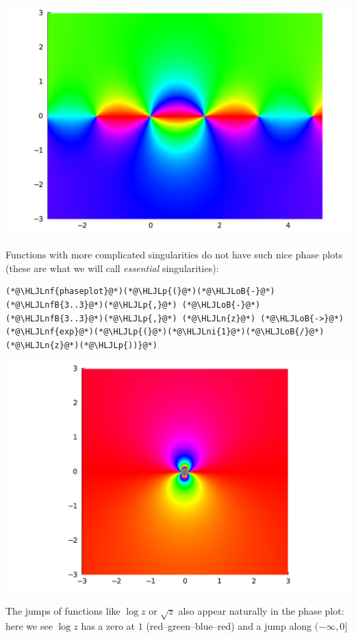 \documentclass[12pt,a4paper]{article}
\newcommand{\HLJLn}[1]{#1}
\newcommand{\HLJLnf}[1]{\textcolor[RGB]{66,102,213}{#1}}
\newcommand{\HLJLnfB}[1]{\textcolor[RGB]{59,151,46}{#1}}
\newcommand{\HLJLni}[1]{\textcolor[RGB]{59,151,46}{#1}}
\newcommand{\HLJLoB}[1]{\textcolor[RGB]{102,102,102}{\textbf{#1}}}
\newcommand{\HLJLp}[1]{#1}
\def\endash{–}
\begin{document}
\includegraphics[width=\linewidth]{jl_z7eR69/Lecture1_10_1.pdf}

Functions with more complicated singularities do not have such nice phase plots (these are what we will call \emph{essential} singularities):


\begin{lstlisting}
(*@\HLJLnf{phaseplot}@*)(*@\HLJLp{(}@*)(*@\HLJLoB{-}@*)(*@\HLJLnfB{3..3}@*)(*@\HLJLp{,}@*) (*@\HLJLoB{-}@*)(*@\HLJLnfB{3..3}@*)(*@\HLJLp{,}@*) (*@\HLJLn{z}@*) (*@\HLJLoB{->}@*) (*@\HLJLnf{exp}@*)(*@\HLJLp{(}@*)(*@\HLJLni{1}@*)(*@\HLJLoB{/}@*)(*@\HLJLn{z}@*)(*@\HLJLp{))}@*)
\end{lstlisting}

\includegraphics[width=\linewidth]{jl_z7eR69/Lecture1_11_1.pdf}

The jumps of functions like $\log z$ or $\sqrt z$ also appear naturally in the phase plot: here we see $\log z$ has a zero at $1$ (red\ensuremath{\endash}green\ensuremath{\endash}blue\ensuremath{\endash}red) and a jump along $(-\infty,0]$
\end{document}
